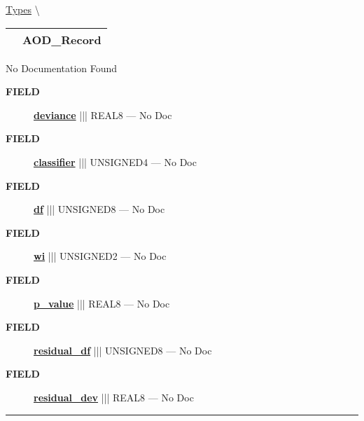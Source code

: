 \hypertarget{ecldoc:logisticregression.types.aod_record}{}
\hspace{0pt} \hyperlink{ecldoc:LogisticRegression.Types}{Types} \textbackslash 

{\renewcommand{\arraystretch}{1.5}
\begin{tabularx}{\textwidth}{|>{\raggedright\arraybackslash}l|X|}
\hline
\hspace{0pt}\mytexttt{\color{red} } & \textbf{AOD\_Record} \\
\hline
\end{tabularx}
}

\par





No Documentation Found







\par
\begin{description}
\item [\colorbox{tagtype}{\color{white} \textbf{\textsf{FIELD}}}] \textbf{\underline{deviance}} ||| REAL8 --- No Doc
\item [\colorbox{tagtype}{\color{white} \textbf{\textsf{FIELD}}}] \textbf{\underline{classifier}} ||| UNSIGNED4 --- No Doc
\item [\colorbox{tagtype}{\color{white} \textbf{\textsf{FIELD}}}] \textbf{\underline{df}} ||| UNSIGNED8 --- No Doc
\item [\colorbox{tagtype}{\color{white} \textbf{\textsf{FIELD}}}] \textbf{\underline{wi}} ||| UNSIGNED2 --- No Doc
\item [\colorbox{tagtype}{\color{white} \textbf{\textsf{FIELD}}}] \textbf{\underline{p\_value}} ||| REAL8 --- No Doc
\item [\colorbox{tagtype}{\color{white} \textbf{\textsf{FIELD}}}] \textbf{\underline{residual\_df}} ||| UNSIGNED8 --- No Doc
\item [\colorbox{tagtype}{\color{white} \textbf{\textsf{FIELD}}}] \textbf{\underline{residual\_dev}} ||| REAL8 --- No Doc
\end{description}





\rule{\linewidth}{0.5pt}



